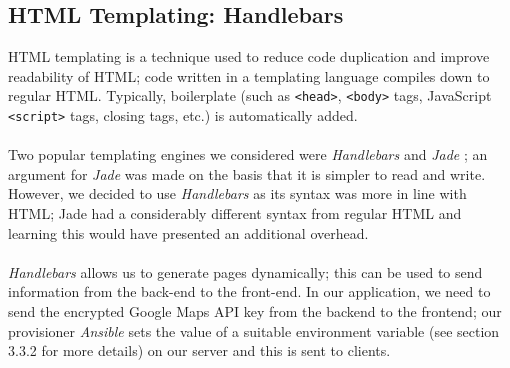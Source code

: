 \documentclass[a4paper, 10pt]{report}
\begin{document}
\subsection{HTML Templating: Handlebars}
HTML templating is a technique used to reduce code duplication and improve readability of HTML; code written in a templating language compiles down to regular HTML. Typically, boilerplate (such as \texttt{<head>}, \texttt{<body>} tags, JavaScript \texttt{<script>} tags, closing tags, etc.) is automatically added. \\\\
Two popular templating engines we considered were \textit{Handlebars} \cite{handlebars} and \textit{Jade} \cite{jade}; an argument for \textit{Jade} was made on the basis that it is simpler to read and write. However, we decided to use \textit{Handlebars} as its syntax was more in line with HTML; Jade had a considerably different syntax from regular HTML and learning this would have presented an additional overhead. \\\\
\textit{Handlebars} allows us to generate pages dynamically; this can be used to send information from the back-end to the front-end. In our application, we need to send the encrypted Google Maps API key from the backend to the frontend; our provisioner \textit{Ansible} \cite{ansible} sets the value of a suitable environment variable (see section 3.3.2 for more details) on our server and this is sent to clients.
\end{document}

